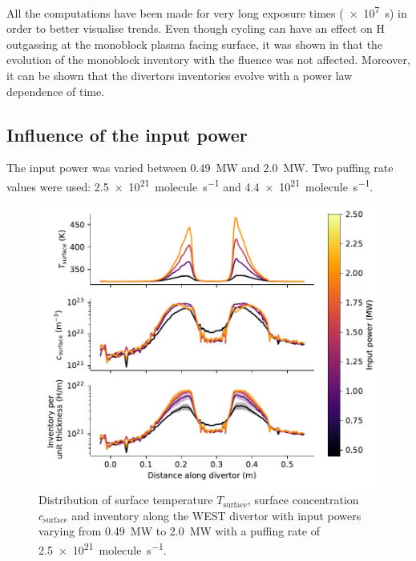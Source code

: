 All the computations have been made for very long exposure times (\SI{e7}{s}) in order to better visualise trends.
Even though cycling can have an effect on H outgassing at the monoblock plasma facing surface, it was shown in  that the evolution of the monoblock inventory with the fluence was not affected.
Moreover, it can be shown that the divertors inventories evolve with a power law dependence of time.

\subsection{Influence of the input power}

The input power was varied between \SI{0.49}{MW} and \SI{2.0}{MW}.
Two puffing rate values were used: \SI{2.5e21}{molecule.s^{-1}} and \SI{4.4e21}{molecule.s^{-1}}.

\begin{figure}[h]
    \centering
    \includegraphics[width=\linewidth]{Figures/Chapter4/WEST/inventory_along_divertor_input_power.pdf}
    \caption{Distribution of surface temperature $T_\mathrm{surface}$, surface concentration $c_\mathrm{surface}$ and inventory along the WEST divertor with input powers varying from \SI{0.49}{MW} to \SI{2.0}{MW} with a puffing rate of \SI{2.5e21}{molecule.s^{-1}}.}
\end{figure}

